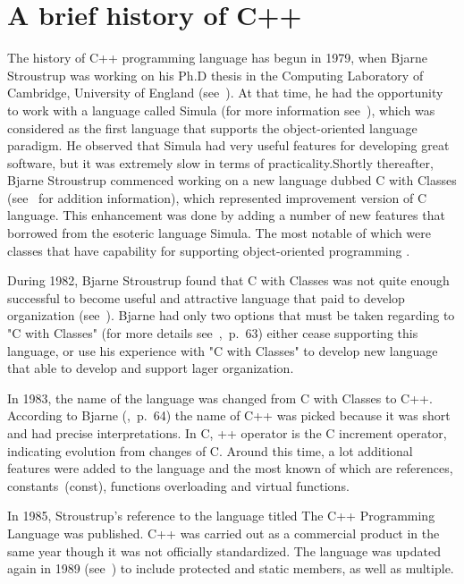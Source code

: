 \documentclass[11pt]{report}
\begin{document}
\section{A brief history of C++}
\label{sec: History of C++}
The history of C++ programming language has begun in 1979, when Bjarne Stroustrup was working on his Ph.D thesis in the Computing Laboratory of Cambridge, University of England (see~\cite{StroustrupHistory}). At that time, he had the opportunity to work with a language called Simula (for more information see~\cite{Stroustrup:2012:Cpp11}), which was considered as the first language that supports the object-oriented language paradigm. He observed that Simula had very useful features for developing great software, but it was extremely slow in terms of practicality.Shortly thereafter, Bjarne Stroustrup commenced working on a new language dubbed C with Classes (see~\cite{StroustrupHistory} for addition information), which represented improvement version of C language. This enhancement was done by adding a number of new features that borrowed from the esoteric language Simula. The most notable of which were classes that have capability for supporting object-oriented programming . 

During 1982, Bjarne Stroustrup found that C with Classes was not quite enough successful to become useful and attractive language that paid to develop organization (see~\cite{StroustrupHistory}). Bjarne had only two options that must be taken regarding to "C with Classes" (for more details see~\cite{Stroustrup:1994:DesignEvolution},~p.~63) either cease supporting this language, or use his experience with "C with Classes" to develop new language that able to develop and support lager organization.

In 1983, the name of the language was changed from C with Classes to C++. According to Bjarne (\cite{Stroustrup:1994:DesignEvolution},~p.~64) the name of C++ was picked because it was short and had precise interpretations. In C, ++ operator is the C increment operator, indicating evolution from changes of C. Around this time, a lot additional features were added to the language and the most known of which are references, constants~(const), functions overloading and virtual functions.

In 1985, Stroustrup's reference to the language titled The C++ Programming Language was published. C++ was carried out as a commercial product in the same year though it was not officially standardized. The language was updated again in 1989 (see~\cite{CplusplusHistoryofCpp}) to include protected and static members, as well as multiple.
\end{document}
